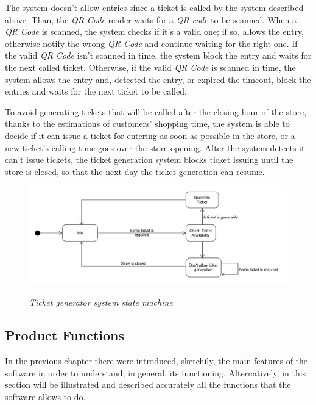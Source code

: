 \documentclass{article}
\begin{document}
		The system doesn't allow entries since a ticket is called by the system described above. Than, the \emph{QR Code} reader waits for a \emph{QR code} to be scanned. When a \emph{QR Code} is scanned, the system checks if it's a valid one; if so, allows the entry, otherwise notify the wrong \emph{QR Code} and continue waiting for the right one. If the valid \emph{QR Code} isn't scanned in time, the system block the entry and waits for the next called ticket. Otherwise, if the valid \emph{QR Code} is scanned in time, the system allows the entry and, detected the entry, or expired the timeout, block the entries and waits for the next ticket to be called.
		
		\bigskip
		
		To avoid generating tickets that will be called after the closing hour of the store, thanks to the estimations of customers' shopping time, the system is able to decide if it can issue a ticket for entering as soon as possible in the store, or a new ticket's calling time goes over the store opening. After the system detects it can't issue tickets, the ticket generation system blocks ticket issuing until the store is closed, so that the next day the ticket generation can resume.
		\begin{figure}[!h]
	
			\centering
			\hspace*{-2cm}\includegraphics[scale=0.5]{StateCharts/ticket_generator_system.pdf} \\
			\caption{\emph{Ticket generator system state machine}}
	
		\end{figure}
	

	\newpage
	\subsection{Product Functions}
		
	In the previous chapter there were introduced, sketchily, the main features of the software in order to understand, in general, its functioning. Alternatively, in this section will be illustrated and described accurately all the functions that the software allows to do.
	
\end{document}
